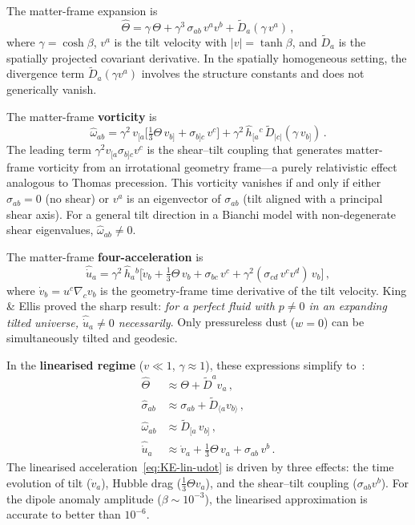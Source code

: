 The matter-frame expansion is
\begin{equation}\label{eq:KE-Theta}
\hat{\Theta}
= \gamma\,\Theta + \gamma^3\,\sigma_{ab}\,v^a v^b
  + \tilde{D}_a(\gamma\, v^a)\,,
\end{equation}
where $\gamma = \cosh\beta$, $v^a$ is the tilt velocity with
$|v| = \tanh\beta$, and $\tilde{D}_a$ is the spatially projected
covariant derivative.  In the spatially homogeneous setting,
the divergence term $\tilde{D}_a(\gamma v^a)$ involves the
structure constants and does not generically vanish.

The matter-frame \textbf{vorticity} is
\begin{equation}\label{eq:KE-omega}
\hat{\omega}_{ab}
= \gamma^2\,v_{[a}\bigl[\tfrac{1}{3}\Theta\,v_{b]}
  + \sigma_{b]c}\,v^c\bigr]
  + \gamma^2\,\hat{h}_{[a}{}^c\,\tilde{D}_{|c|}
    (\gamma\,v_{b]})\,.
\end{equation}
The leading term $\gamma^2 v_{[a}\sigma_{b]c}v^c$ is the
shear--tilt coupling that generates matter-frame vorticity
from an irrotational geometry frame---a purely relativistic
effect analogous to Thomas precession.  This vorticity vanishes
if and only if either $\sigma_{ab} = 0$ (no shear) or $v^a$
is an eigenvector of $\sigma_{ab}$ (tilt aligned with a
principal shear axis).  For a general tilt direction in a
Bianchi model with non-degenerate shear eigenvalues,
$\hat{\omega}_{ab} \neq 0$.

The matter-frame \textbf{four-acceleration} is
\begin{equation}\label{eq:KE-udot}
\hat{\dot{u}}_a
= \gamma^2\,\hat{h}_a{}^b\bigl[
  \dot{v}_b + \tfrac{1}{3}\Theta\,v_b
  + \sigma_{bc}\,v^c
  + \gamma^2(\sigma_{cd}\,v^c v^d)\,v_b
\bigr]\,,
\end{equation}
where $\dot{v}_b = u^c\nabla_c v_b$ is the geometry-frame time
derivative of the tilt velocity.  King \& Ellis proved the
sharp result: \emph{for a perfect fluid with $p \neq 0$ in an
expanding tilted universe, $\hat{\dot{u}}_a \neq 0$
necessarily}.  Only pressureless dust ($w = 0$) can be
simultaneously tilted and geodesic.

In the \textbf{linearised regime} ($v \ll 1$, $\gamma \approx 1$),
these expressions simplify
to~\cite{EllisVanElst1999,EllisMaartens2012}:
\begin{align}
\hat{\Theta} &\approx \Theta + \tilde{D}^a v_a\,,
\label{eq:KE-lin-Theta}\\
\hat{\sigma}_{ab} &\approx \sigma_{ab}
  + \tilde{D}_{\langle a} v_{b\rangle}\,,
\label{eq:KE-lin-sigma}\\
\hat{\omega}_{ab} &\approx \tilde{D}_{[a}\,v_{b]}\,,
\label{eq:KE-lin-omega}\\
\hat{\dot{u}}_a &\approx \dot{v}_a
  + \tfrac{1}{3}\Theta\,v_a
  + \sigma_{ab}\,v^b\,.
\label{eq:KE-lin-udot}
\end{align}
The linearised acceleration~\eqref{eq:KE-lin-udot} is driven
by three effects: the time evolution of tilt ($\dot{v}_a$),
Hubble drag ($\frac{1}{3}\Theta v_a$), and the shear--tilt
coupling ($\sigma_{ab}v^b$).  For the dipole anomaly amplitude
($\beta \sim 10^{-3}$), the linearised approximation is
accurate to better than $10^{-6}$.


